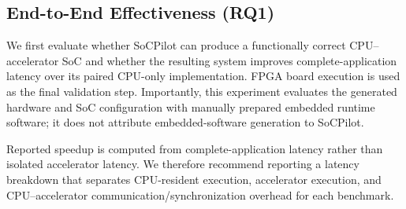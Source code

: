 \subsection{End-to-End Effectiveness (RQ1)}
\label{subsec:e2e_evaluation}

We first evaluate whether SoCPilot can produce a functionally correct CPU--accelerator SoC and whether the resulting system improves complete-application latency over its paired CPU-only implementation. FPGA board execution is used as the final validation step. Importantly, this experiment evaluates the generated hardware and SoC configuration with manually prepared embedded runtime software; it does not attribute embedded-software generation to SoCPilot.

\begin{table}[t]
\centering
\caption{End-to-end effectiveness and FPGA-board validation of SoCPilot-generated SoCs.}
\label{tab:e2e_performance}
\renewcommand{\arraystretch}{1.12}
\end{table}

Reported speedup is computed from complete-application latency rather than isolated accelerator latency. We therefore recommend reporting a latency breakdown that separates CPU-resident execution, accelerator execution, and CPU--accelerator communication/synchronization overhead for each benchmark.


